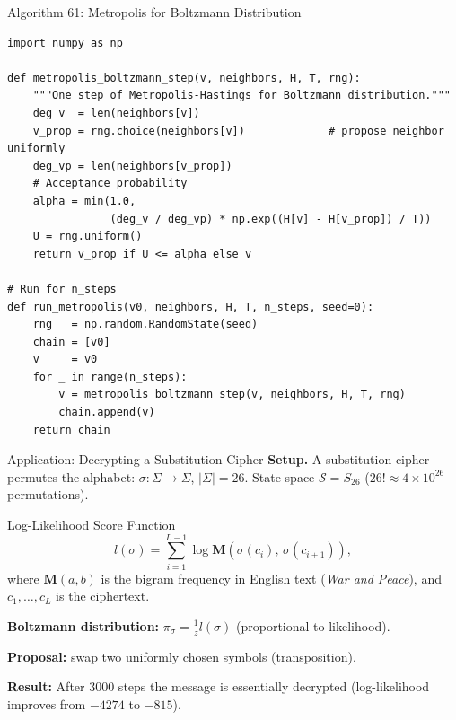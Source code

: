 \documentclass[aspectratio=169,10pt]{beamer}
\newcommand{\calS}{\mathcal{S}}
\begin{document}
\begin{frame}[fragile]{Algorithm 61: Metropolis for Boltzmann Distribution}
  \begin{lstlisting}[style=python]
import numpy as np

def metropolis_boltzmann_step(v, neighbors, H, T, rng):
    """One step of Metropolis-Hastings for Boltzmann distribution."""
    deg_v  = len(neighbors[v])
    v_prop = rng.choice(neighbors[v])             # propose neighbor uniformly
    deg_vp = len(neighbors[v_prop])
    # Acceptance probability
    alpha = min(1.0,
                (deg_v / deg_vp) * np.exp((H[v] - H[v_prop]) / T))
    U = rng.uniform()
    return v_prop if U <= alpha else v

# Run for n_steps
def run_metropolis(v0, neighbors, H, T, n_steps, seed=0):
    rng   = np.random.RandomState(seed)
    chain = [v0]
    v     = v0
    for _ in range(n_steps):
        v = metropolis_boltzmann_step(v, neighbors, H, T, rng)
        chain.append(v)
    return chain
  \end{lstlisting}
\end{frame}

\begin{frame}{Application: Decrypting a Substitution Cipher}
  \textbf{Setup.} A substitution cipher permutes the alphabet:
  $\sigma: \Sigma \to \Sigma$, $|\Sigma|=26$.
  State space $\calS = S_{26}$ ($26! \approx 4 \times 10^{26}$ permutations).

  \begin{block}{Log-Likelihood Score Function}
    \[
      l(\sigma) = \sum_{i=1}^{L-1} \log \mathbf{M}(\sigma(c_i),\,\sigma(c_{i+1})),
    \]
    where $\mathbf{M}(a,b)$ is the bigram frequency in English text
    (\emph{War and Peace}), and $c_1,\ldots,c_L$ is the ciphertext.
  \end{block}

  \textbf{Boltzmann distribution:}
  $\pi_\sigma = \frac{1}{z} l(\sigma)$ (proportional to likelihood).

  \textbf{Proposal:} swap two uniformly chosen symbols (transposition).

  \medskip
  \textbf{Result:} After 3000 steps the message is essentially decrypted
  (log-likelihood improves from $-4274$ to $-815$).
\end{frame}
\end{document}
